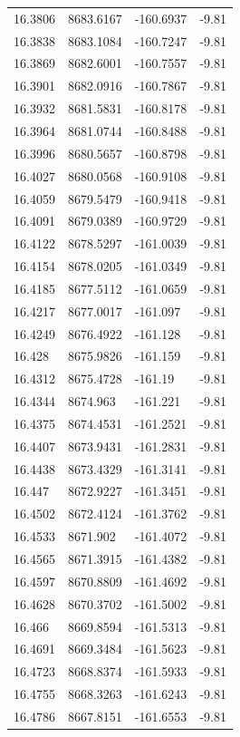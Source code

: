 \begin{table}[H]
\begin{tabular}{llll}
16.3806 & 8683.6167 & -160.6937 & -9.81 \\
16.3838 & 8683.1084 & -160.7247 & -9.81 \\
16.3869 & 8682.6001 & -160.7557 & -9.81 \\
16.3901 & 8682.0916 & -160.7867 & -9.81 \\
16.3932 & 8681.5831 & -160.8178 & -9.81 \\
16.3964 & 8681.0744 & -160.8488 & -9.81 \\
16.3996 & 8680.5657 & -160.8798 & -9.81 \\
16.4027 & 8680.0568 & -160.9108 & -9.81 \\
16.4059 & 8679.5479 & -160.9418 & -9.81 \\
16.4091 & 8679.0389 & -160.9729 & -9.81 \\
16.4122 & 8678.5297 & -161.0039 & -9.81 \\
16.4154 & 8678.0205 & -161.0349 & -9.81 \\
16.4185 & 8677.5112 & -161.0659 & -9.81 \\
16.4217 & 8677.0017 & -161.097 & -9.81 \\
16.4249 & 8676.4922 & -161.128 & -9.81 \\
16.428 & 8675.9826 & -161.159 & -9.81 \\
16.4312 & 8675.4728 & -161.19 & -9.81 \\
16.4344 & 8674.963 & -161.221 & -9.81 \\
16.4375 & 8674.4531 & -161.2521 & -9.81 \\
16.4407 & 8673.9431 & -161.2831 & -9.81 \\
16.4438 & 8673.4329 & -161.3141 & -9.81 \\
16.447 & 8672.9227 & -161.3451 & -9.81 \\
16.4502 & 8672.4124 & -161.3762 & -9.81 \\
16.4533 & 8671.902 & -161.4072 & -9.81 \\
16.4565 & 8671.3915 & -161.4382 & -9.81 \\
16.4597 & 8670.8809 & -161.4692 & -9.81 \\
16.4628 & 8670.3702 & -161.5002 & -9.81 \\
16.466 & 8669.8594 & -161.5313 & -9.81 \\
16.4691 & 8669.3484 & -161.5623 & -9.81 \\
16.4723 & 8668.8374 & -161.5933 & -9.81 \\
16.4755 & 8668.3263 & -161.6243 & -9.81 \\
16.4786 & 8667.8151 & -161.6553 & -9.81 \\

\end{tabular}
\end{table}
